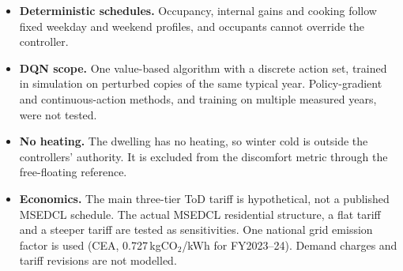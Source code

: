 \begin{itemize}
humidity is reported separately rather than combined into PMV or an adaptive (IMAC)
index.
\item \textbf{Deterministic schedules.} Occupancy, internal gains and cooking follow fixed
weekday and weekend profiles, and occupants cannot override the controller.
\item \textbf{DQN scope.} One value-based algorithm with a discrete action set, trained
in simulation on perturbed copies of the same typical year. Policy-gradient and
continuous-action methods, and training on multiple measured years, were not tested.
\item \textbf{No heating.} The dwelling has no heating, so winter cold is outside the
controllers' authority. It is excluded from the discomfort metric through the
free-floating reference.
\item \textbf{Economics.} The main three-tier ToD tariff is hypothetical, not a published
MSEDCL schedule. The actual MSEDCL residential structure, a flat tariff and a steeper
tariff are tested as sensitivities. One national grid emission factor is used
(CEA, 0.727\,kgCO$_2$/kWh for FY2023--24). Demand charges and tariff revisions are not modelled.
\end{itemize}

